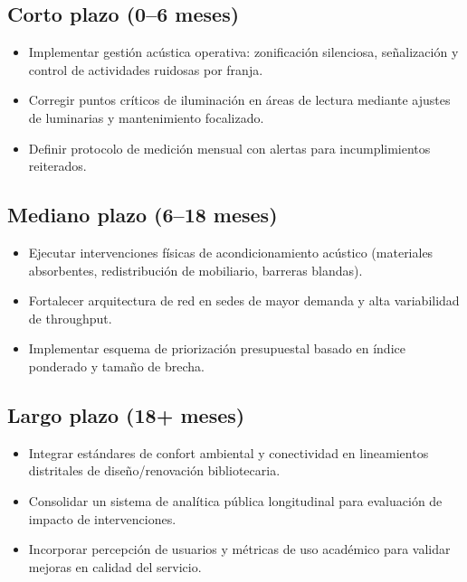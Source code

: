 
\subsection*{Corto plazo (0--6 meses)}
\begin{itemize}
\item Implementar gestión acústica operativa: zonificación silenciosa, señalización y control de actividades ruidosas por franja.
\item Corregir puntos críticos de iluminación en áreas de lectura mediante ajustes de luminarias y mantenimiento focalizado.
\item Definir protocolo de medición mensual con alertas para incumplimientos reiterados.
\end{itemize}

\subsection*{Mediano plazo (6--18 meses)}
\begin{itemize}
\item Ejecutar intervenciones físicas de acondicionamiento acústico (materiales absorbentes, redistribución de mobiliario, barreras blandas).
\item Fortalecer arquitectura de red en sedes de mayor demanda y alta variabilidad de throughput.
\item Implementar esquema de priorización presupuestal basado en índice ponderado y tamaño de brecha.
\end{itemize}

\subsection*{Largo plazo (18+ meses)}
\begin{itemize}
\item Integrar estándares de confort ambiental y conectividad en lineamientos distritales de diseño/renovación bibliotecaria.
\item Consolidar un sistema de analítica pública longitudinal para evaluación de impacto de intervenciones.
\item Incorporar percepción de usuarios y métricas de uso académico para validar mejoras en calidad del servicio.
\end{itemize}
